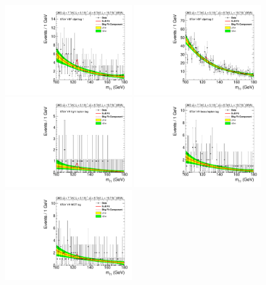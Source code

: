 \begin{figure}
  \vspace{-1cm}
  \includegraphics[width=0.49\textwidth]{results/plots/mgg-cats/mgg_mva_nosub_ch2_cat6_8TeV.pdf}
  \includegraphics[width=0.49\textwidth]{results/plots/mgg-cats/mgg_mva_nosub_ch2_cat7_8TeV.pdf}
  \includegraphics[width=0.49\textwidth]{results/plots/mgg-cats/mgg_mva_nosub_ch2_cat8_8TeV.pdf}
  \includegraphics[width=0.49\textwidth]{results/plots/mgg-cats/mgg_mva_nosub_ch2_cat9_8TeV.pdf}
  \includegraphics[width=0.49\textwidth]{results/plots/mgg-cats/mgg_mva_nosub_ch2_cat10_8TeV.pdf}

\end{figure}
